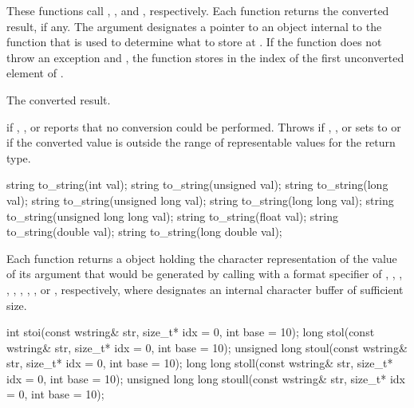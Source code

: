 \begin{itemdescr}
\pnum
\effects These functions call
, , and
, respectively. Each function returns
the converted result, if any. The argument  designates a pointer to
an object internal to the function that is used to determine what to store at
. If the function does not throw an exception and ,
the function stores in  the index of the first unconverted element
of .

\pnum
\returns The converted result.

\pnum
\throws {} if , , or
 reports that no conversion could be performed. Throws
 if , , or
 sets  to 
or if the converted value is outside the range of representable
values for the return type.
\end{itemdescr}

%
\begin{itemdecl}
string to_string(int val);
string to_string(unsigned val);
string to_string(long val);
string to_string(unsigned long val);
string to_string(long long val);
string to_string(unsigned long long val);
string to_string(float val);
string to_string(double val);
string to_string(long double val);
\end{itemdecl}

\begin{itemdescr}
\pnum
\returns Each function returns a  object holding the character
representation of the value of its argument that would be generated by calling
 with a format specifier of
,
,
,
,
,  ,
,
,
or , respectively, where  designates an internal
character buffer of sufficient size.
\end{itemdescr}

%
%
%
%
%
\begin{itemdecl}
int stoi(const wstring& str, size_t* idx = 0, int base = 10);
long stol(const wstring& str, size_t* idx = 0, int base = 10);
unsigned long stoul(const wstring& str, size_t* idx = 0, int base = 10);
long long stoll(const wstring& str, size_t* idx = 0, int base = 10);
unsigned long long stoull(const wstring& str, size_t* idx = 0, int base = 10);
\end{itemdecl}

